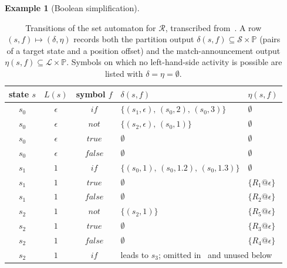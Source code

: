 \documentclass[11pt]{article}
\theoremstyle{plain}
\theoremstyle{definition}
\newtheorem{example}[theorem]{Example}
\theoremstyle{remark}
\newcommand{\Pos}{\mathbb{P}}
\newcommand{\States}{\mathcal{S}}
\newcommand{\Lhs}{\mathcal{L}}
\begin{document}
\begin{example}[Boolean simplification]
\begin{table}[h]
\centering
\renewcommand{\arraystretch}{1.15}
\begin{tabular}{c|c|c|l|l}
state $s$ & $L(s)$ & symbol $f$ & $\delta(s, f)$ & $\eta(s, f)$ \\\hline
$s_{0}$ & $\epsilon$ & $\mathit{if}$    & $\{(s_{1}, \epsilon),\, (s_{0}, 2),\, (s_{0}, 3)\}$ & $\emptyset$ \\
$s_{0}$ & $\epsilon$ & $\mathit{not}$   & $\{(s_{2}, \epsilon),\, (s_{0}, 1)\}$               & $\emptyset$ \\
$s_{0}$ & $\epsilon$ & $\mathit{true}$  & $\emptyset$                                          & $\emptyset$ \\
$s_{0}$ & $\epsilon$ & $\mathit{false}$ & $\emptyset$                                          & $\emptyset$ \\\hline
$s_{1}$ & $1$        & $\mathit{if}$    & $\{(s_{0}, 1),\, (s_{0}, 1.2),\, (s_{0}, 1.3)\}$    & $\emptyset$ \\
$s_{1}$ & $1$        & $\mathit{true}$  & $\emptyset$                                          & $\{R_{1}@\epsilon\}$ \\
$s_{1}$ & $1$        & $\mathit{false}$ & $\emptyset$                                          & $\{R_{2}@\epsilon\}$ \\\hline
$s_{2}$ & $1$        & $\mathit{not}$   & $\{(s_{2}, 1)\}$                                     & $\{R_{5}@\epsilon\}$ \\
$s_{2}$ & $1$        & $\mathit{true}$  & $\emptyset$                                          & $\{R_{3}@\epsilon\}$ \\
$s_{2}$ & $1$        & $\mathit{false}$ & $\emptyset$                                          & $\{R_{4}@\epsilon\}$ \\
$s_{2}$ & $1$        & $\mathit{if}$    & \multicolumn{2}{l}{leads to $s_{3}$; omitted in~\cite[Fig.~3]{BouwmanErkens2022} and unused below} \\
\end{tabular}
\caption{Transitions of the set automaton for $\mathcal{R}$, transcribed
from~\cite[Fig.~3]{BouwmanErkens2022}. A row $(s, f) \mapsto (\delta, \eta)$
records both the partition output $\delta(s, f) \subseteq \States \times \Pos$
(pairs of a target state and a position offset) and the match-announcement
output $\eta(s, f) \subseteq \Lhs \times \Pos$. Symbols on which no
left-hand-side activity is possible are listed with $\delta = \eta = \emptyset$.}
\label{tab:setautomatonif}
\end{table}

\end{example}
\end{document}
